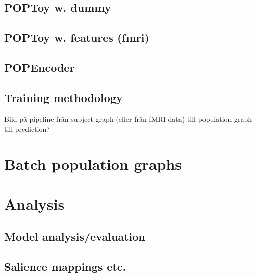 \subsection{POPToy w. dummy}
\subsection{POPToy w. features (fmri)}
\subsection{POPEncoder}
\subsection{Training methodology} %
Bild på pipeline från subject graph (eller från fMRI-data) till population graph till prediction?

\section{Batch population graphs}

\section{Analysis}
\subsection{Model analysis/evaluation}
\subsection{Salience mappings etc.}



